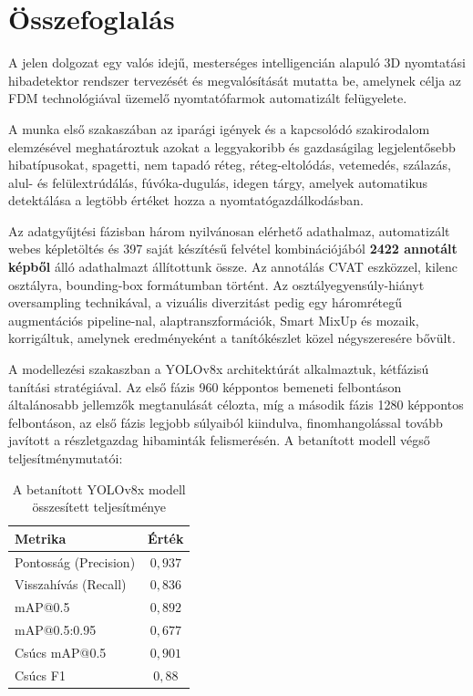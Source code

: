 \section{Összefoglalás}

A jelen dolgozat egy valós idejű, mesterséges intelligencián alapuló 3D nyomtatási hibadetektor rendszer
tervezését és megvalósítását mutatta be, amelynek célja az FDM technológiával üzemelő nyomtatófarmok
automatizált felügyelete.

A munka első szakaszában az iparági igények és a kapcsolódó szakirodalom elemzésével meghatároztuk azokat
a leggyakoribb és gazdaságilag legjelentősebb hibatípusokat,  spagetti, nem tapadó réteg, réteg-eltolódás,
vetemedés, szálazás, alul- és felülextrúdálás, fúvóka-dugulás, idegen tárgy, amelyek automatikus
detektálása a legtöbb értéket hozza a nyomtatógazdálkodásban.

Az adatgyűjtési fázisban három nyilvánosan elérhető adathalmaz, automatizált webes képletöltés és 397 saját
készítésű felvétel kombinációjából \textbf{2422 annotált képből} álló adathalmazt állítottunk össze.
Az annotálás CVAT eszközzel, kilenc osztályra, bounding-box formátumban történt. Az osztályegyensúly-hiányt
oversampling technikával, a vizuális diverzitást pedig egy háromrétegű augmentációs pipeline-nal,
alaptranszformációk, Smart MixUp és mozaik, korrigáltuk, amelynek eredményeként a tanítókészlet közel
négyszeresére bővült.

A modellezési szakaszban a YOLOv8x architektúrát alkalmaztuk, kétfázisú tanítási stratégiával.
Az első fázis 960 képpontos bemeneti felbontáson általánosabb jellemzők megtanulását célozta, míg a
második fázis 1280 képpontos felbontáson, az első fázis legjobb súlyaiból kiindulva, finomhangolással
tovább javított a részletgazdag hibaminták felismerésén. A betanított modell végső teljesítménymutatói:

\begin{table}[H]
\centering
\caption{A betanított YOLOv8x modell összesített teljesítménye}
\renewcommand{\arraystretch}{1.4}
\begin{tabular}{|l|c|}
    \hline
    \textbf{Metrika} & \textbf{Érték} \\
    \hline
    Pontosság (Precision) & $0{,}937$ \\
    \hline
    Visszahívás (Recall)  & $0{,}836$ \\
    \hline
    mAP@0.5               & $0{,}892$ \\
    \hline
    mAP@0.5:0.95          & $0{,}677$ \\
    \hline
    Csúcs mAP@0.5         & $0{,}901$ \\
    \hline
    Csúcs F1              & $0{,}88$ \\
    \hline
\end{tabular}
\end{table}

